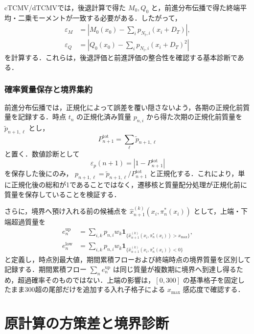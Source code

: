 \documentclass[10pt,a4paper]{article}
\theoremstyle{plain}
\theoremstyle{definition}
\newcommand{\one}{\mathbf{1}}
\begin{document}
cTCMV/dTCMVでは，後退計算で得た $M_0,Q_0$ と，前進分布伝播で得た終端平均・二乗モーメントが一致する必要がある．したがって，
\begin{align}
  \varepsilon_M&=
  \left|M_0(x_0)-\sum_i p_{N_t,i}(x_i+D_T)\right|,
  \label{eq:eps-M}\\
  \varepsilon_Q&=
  \left|Q_0(x_0)-\sum_i p_{N_t,i}(x_i+D_T)^2\right|
  \label{eq:eps-Q}
\end{align}
を計算する．これらは，後退評価と前進評価の整合性を確認する基本診断である．

\subsubsection{確率質量保存と境界集約}

前進分布伝播では，正規化によって誤差を覆い隠さないよう，各期の正規化前質量を記録する．時点 $t_n$ の正規化済み質量 $p_{n,i}$ から得た次期の正規化前質量を $\widetilde p_{n+1,\ell}$ とし，
\begin{equation}
  P_{n+1}^{\mathrm{tot}}=\sum_{\ell}\widetilde p_{n+1,\ell}
  \label{eq:mass-total}
\end{equation}
と置く．数値診断として
\begin{equation}
  \varepsilon_p(n+1)=\left|1-P_{n+1}^{\mathrm{tot}}\right|
  \label{eq:mass-error}
\end{equation}
を保存した後にのみ， $p_{n+1,\ell}=\widetilde p_{n+1,\ell}/P_{n+1}^{\mathrm{tot}}$ と正規化する．これにより，単に正規化後の総和が1であることではなく，遷移核と質量配分処理が正規化前に質量を保存していることを検証する．

さらに，境界へ預け入れる前の候補点を $\widehat{x}_{n+1}^{(k)}(x_i,\pi_n^*(x_i))$ として，上端・下端超過質量を
\begin{align}
  e_n^{\mathrm{up}}
  &=\sum_{i,k}p_{n,i}w_k\one_{\{\widehat{x}_{n+1}^{(k)}(x_i,\pi_n^*(x_i))>x_{\max}\}},\\
  e_n^{\mathrm{low}}
  &=\sum_{i,k}p_{n,i}w_k\one_{\{\widehat{x}_{n+1}^{(k)}(x_i,\pi_n^*(x_i))<0\}}
  \label{eq:boundary-excursion}
\end{align}
と定義し，時点別最大値，期間累積フローおよび終端時点の境界質量を区別して記録する．期間累積フロー $\sum_n e_n^{\mathrm{up}}$ は同じ質量が複数期に境界へ到達し得るため，超過確率そのものではない．上端の影響は，$[0,300]$ の基準格子を固定したまま300超の尾部だけを追加する入れ子格子による $x_{\max}$ 感応度で確認する．


\section{原計算の方策差と境界診断}
\end{document}
